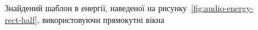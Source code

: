 \begin{figure}[h]

            \caption{Знайдений шаблон в енергії, наведеної на рисунку~\ref{fig:audio-energy-rect-half}, використовуючи
                прямокутні вікна}
            \label{fig:matched-energy-rect-half-rect}
        \end{figure}

